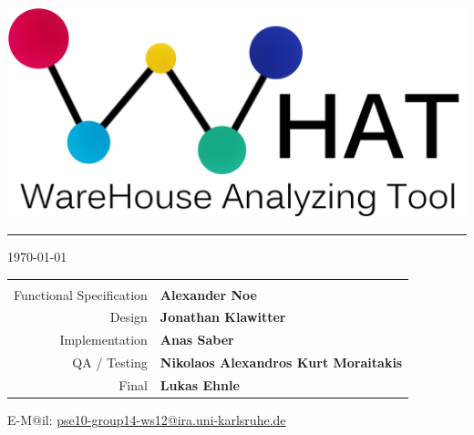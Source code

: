 \begin{titlepage}
\begin{center}
\begin{center}
   \includegraphics[width=0.7\linewidth]{Pictures/WHAT-LogoText2.png}
   
\end{center} 


\vspace*{2.7cm}

{\color{Bittersweet}\hrule}
\vspace*{0.4cm}
 {\today}
 
\vspace*{0.4cm}
\normalsize

 

\begin{tabular}{r l}

\arrayrulecolor{Bittersweet!90}
\hline
& \\
 
  	Functional Specification
&
	\textbf{Alexander Noe}
\\ 
	Design
& 
	\textbf{Jonathan Klawitter}
\\ 
	Implementation 
& 
	\textbf{Anas Saber}
\\
	QA / Testing 
&
	\textbf{Nikolaos Alexandros Kurt Moraitakis}
\\
	Final 
&	\textbf{Lukas Ehnle}\\

 
\end{tabular}

E-M@il: \href{mailto:pse10-group14-ws12@ira.uni-karlsruhe.de}{pse10-group14-ws12@ira.uni-karlsruhe.de}

\end{center}
\end{titlepage}